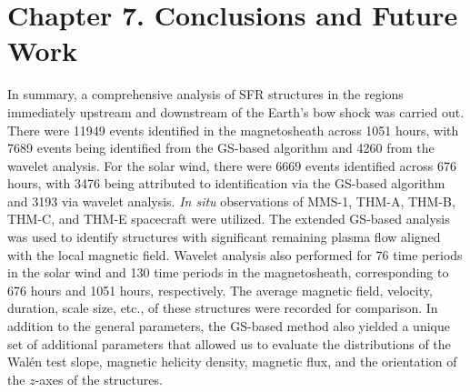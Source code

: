 \chapter{Chapter 7. Conclusions and Future Work}

In summary, a comprehensive analysis of SFR structures in the regions immediately upstream and downstream of the Earth's bow shock was carried out. There were 11949 events identified in the magnetosheath across 1051 hours, with 7689 events being identified from the GS-based algorithm and 4260 from the wavelet analysis. For the solar wind, there were 6669 events identified across 676 hours, with 3476 being attributed to identification via the GS-based algorithm and 3193 via wavelet analysis. \textit{In situ} observations of MMS-1, THM-A, THM-B, THM-C, and THM-E spacecraft were utilized. The extended GS-based analysis was used to identify structures with significant remaining plasma flow aligned with the local magnetic field. Wavelet analysis also performed for 76 time periods in the solar wind and 130 time periods in the magnetosheath, corresponding to 676 hours and 1051 hours, respectively. The average magnetic field, velocity, duration, scale size, etc., of these structures were recorded for comparison. In addition to the general parameters, the GS-based method also yielded a unique set of additional parameters that allowed us to evaluate the distributions of the Wal\'en test slope, magnetic helicity density, magnetic flux, and the orientation of the $z$-axes of the structures.

